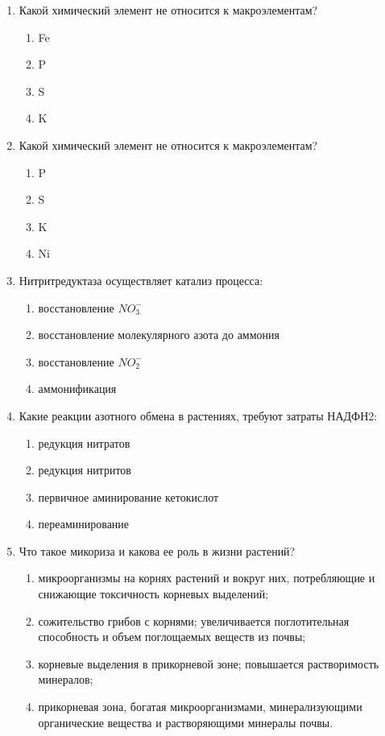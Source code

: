 \begin{enumerate}
\item Какой химический элемент не относится к макроэлементам?
\begin{enumerate}
	\item Fe        
	\item P
	\item S         
	\item K
\end{enumerate}

\item Какой химический элемент не относится к макроэлементам?
\begin{enumerate}
	\item P        
	\item S
	\item K        
	\item Ni
\end{enumerate}

\item Нитритредуктаза осуществляет катализ процесса:
\begin{enumerate}
	\item восстановление $NO^{-}_{3}$               
	\item восстановление молекулярного азота до аммония
	\item восстановление $NO^{-}_{2}$          
	\item аммонификация
\end{enumerate}

\item Какие реакции азотного обмена в растениях, требуют затраты НАДФН2:
\begin{enumerate}
	\item редукция нитратов                                          
	\item редукция нитритов
	\item первичное аминирование кетокислот          
	\item переаминирование
\end{enumerate}

\item Что такое микориза и какова ее роль в жизни растений?
\begin{enumerate}
	\item микроорганизмы на корнях растений и вокруг них, потребляющие и снижающие токсичность корневых выделений; 
	\item сожительство грибов с корнями; увеличивается поглотительная способность и объем поглощаемых веществ из почвы; 
	\item корневые выделения в прикорневой зоне; повышается растворимость минералов; 
	\item прикорневая зона, богатая микроорганизмами, минерализующими органические вещества и растворяющими минералы почвы.
\end{enumerate}


\end{enumerate}

